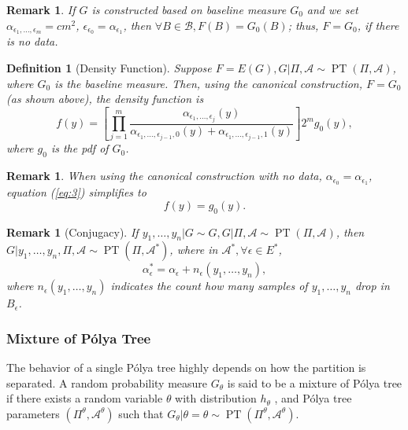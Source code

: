 \documentclass[12pt]{article}
\newtheorem{deff}[thm]{Definition}
\newtheorem{rmk}[thm]{Remark}
\newcommand{\polya}{P\'{o}lya}
\DeclareMathOperator{\pt}{PT}
\begin{document}
\begin{rmk}
  If $G$ is constructed based on baseline measure $G_0$ and we set
  $\alpha_{\epsilon_1, \ldots, \epsilon_m} = cm^2 $,
  $\epsilon_{\epsilon_0 }= \alpha_{\epsilon_1}$, then $\forall B \in
  \mathcal{B}, F(B) = G_0(B)$; thus, $F=G_0$, if there is no data.
\end{rmk}

\begin{deff}[Density Function]
  Suppose $F=E(G), G|\Pi, \mathcal{A} \sim \pt (\Pi, \mathcal{A})$,
  where $G_0 $ is the baseline measure. Then, using the canonical
  construction, $F=G_0$ (as shown above), the density function is
  \begin{equation}\label{eq:3}
    f(y) = \left[ \prod_{j=1}^m \frac{ \alpha_{\epsilon_1, \ldots,
          \epsilon_j}(y)}{\alpha_{\epsilon_1, \ldots, \epsilon_{j-1},0}(y)
        + \alpha_{\epsilon_1, \ldots, \epsilon_{j-1},1}(y)} \right] 2^{m } g_0(y),
  \end{equation}
  where $g_0$ is the pdf of $G_0$.
\end{deff}

\begin{rmk}
  When using the canonical construction with no data,
  $\alpha_{\epsilon_0 } = \alpha_{\epsilon_1}$, equation (\ref{eq:3})
  simplifies to
  \begin{displaymath}
    f(y) = g_0(y).
  \end{displaymath}
\end{rmk}

\begin{rmk}[Conjugacy] If $y_1, \ldots, y_n | G \sim G, G|\Pi,
  \mathcal{A} \sim \pt (\Pi, \mathcal{A})$, then $G|y_1, \ldots, y_n ,
  \Pi, \mathcal{A} \sim \pt (\Pi, \mathcal{A}^{*})$, where in
  $\mathcal{A}^{*}, \forall \epsilon \in E^{*}$,
  \begin{displaymath}
    \alpha_{\epsilon}^{*} = \alpha_{\epsilon} + n_{\epsilon}(y_1, \ldots, y_n),
  \end{displaymath}
  where $n_{\epsilon}(y_1, \ldots, y_n)$ indicates the count how many
  samples of $y_1, \ldots, y_n$ drop in $B_{\epsilon}$.
\end{rmk}

\subsubsection{Mixture of \polya{} Tree}
The behavior of a single \polya{} tree highly depends on how the
partition is separated. A random probability measure $G_\theta$ is
said to be a mixture of \polya{} tree if there exists a random
variable $\theta$ with distribution $h_{\theta}$ , and \polya{} tree
parameters $(\Pi^{\theta}, \mathcal{A}^{\theta})$ such that
$G_{\theta} | \theta=\theta \sim \pt (\Pi^{\theta},
\mathcal{A}^{\theta})$.
\end{document}
